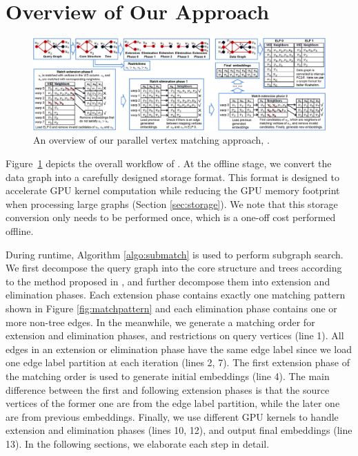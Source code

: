 
\section{Overview of Our Approach}
\begin{figure}
	\centering
	\includegraphics[width=\textwidth]{./figure/approachoverview.eps}
	\caption{An overview of our parallel vertex matching approach, \SystemName.}
	\label{fig:overview}
\end{figure}

Figure~\ref{fig:overview} depicts the overall workflow of \SystemName. At the offline stage, we convert the data graph into a carefully designed storage format. This format is designed to accelerate GPU kernel computation while reducing the GPU memory footprint when processing large graphs (Section \ref{sec:storage}). We note that this storage conversion only needs to be performed once, which is a one-off cost performed offline.

During runtime, Algorithm \ref{algo:submatch} is used to perform subgraph search. We first decompose the query graph into the core structure and trees according to the method proposed in \cite{bi2016efficient}, and further decompose them into extension and elimination phases. Each extension phase contains exactly one matching pattern shown in Figure \ref{fig:matchpattern} and each elimination phase contains one or more non-tree edges. In the meanwhile, we generate a matching order for extension and elimination phases, and restrictions on query vertices (line 1). All edges in an extension or elimination phase have the same edge label since we load one edge label partition at each iteration (lines 2, 7). The first extension phase of the matching order is used to generate initial embeddings (line 4). The main difference between the first and following extension phases is that the source vertices of the former one are from the edge label partition, while the later one are from previous embeddings. Finally, we use different GPU kernels to handle extension and elimination phases (lines 10, 12), and output final embeddings (line 13). In the following sections, we elaborate each step in detail.


